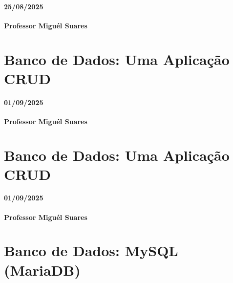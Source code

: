 \documentclass[
]{book}
\begin{document}
\subsubsection*{25/08/2025}\label{section-4}

\subsubsection*{Professor Miguél Suares}\label{professor-miguuxe9l-suares-4}

\chapter{Banco de Dados: Uma Aplicação CRUD}\label{banco-de-dados-uma-aplicauxe7uxe3o-crud}

\subsubsection*{01/09/2025}\label{section-5}

\subsubsection*{Professor Miguél Suares}\label{professor-miguuxe9l-suares-5}

\chapter{Banco de Dados: Uma Aplicação CRUD}\label{banco-de-dados-uma-aplicauxe7uxe3o-crud-1}

\subsubsection*{01/09/2025}\label{section-6}

\subsubsection*{Professor Miguél Suares}\label{professor-miguuxe9l-suares-6}

\chapter{Banco de Dados: MySQL (MariaDB)}\label{banco-de-dados-mysql-mariadb}
\end{document}
